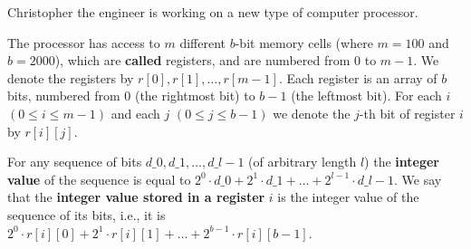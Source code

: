 Christopher the engineer is working on a new type of computer processor.

The processor has access to $m$ different $b$-bit memory cells (where $m = 100$ and $b=2000$),
which are \textbf{called} registers, and are numbered from $0$ to $m-1$. We denote the registers by $r[0], r[1], \ldots, r[m-1]$.
Each register is an array of $b$ bits, numbered from $0$ (the rightmost bit) to
$b-1$ (the leftmost bit). For each $i$ $(0\leq i \leq m-1)$ and each $j$ $(0 \leq j \leq b-1)$ we denote the $j$-th bit of register $i$ by $r[i][j]$.

For any sequence of bits $d\_0, d\_1, \ldots, d\_{l-1}$ (of arbitrary length $l$) the \textbf{integer value} of the sequence
is equal to $2^0 \cdot d\_0 + 2^1 \cdot d\_1 + \ldots + 2^{l-1} \cdot d\_{l-1}$.
We say that the \textbf{integer value stored in a register}
$i$ is the integer value of the sequence of its bits, i.e., it is $2^0 \cdot r[i][0] + 2^1 \cdot r[i][1] + \ldots + 2^{b-1} \cdot r[i][b-1]$.

